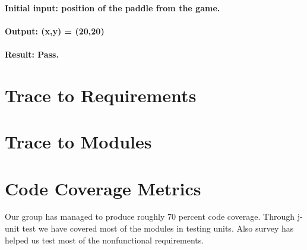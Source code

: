 \documentclass[12pt, titlepage]{article}
\begin{document}
\paragraph {Initial input: position of the paddle from the game.}
\paragraph {Output: (x,y) = (20,20)}
\paragraph {Result: Pass.}

		
\section{Trace to Requirements}
		
\section{Trace to Modules}		

\section{Code Coverage Metrics}
Our group has managed to produce roughly 70 percent code coverage. Through j-unit test we have covered most of the modules in testing units. Also survey has helped us test most of the nonfunctional requirements.




\end{document}
